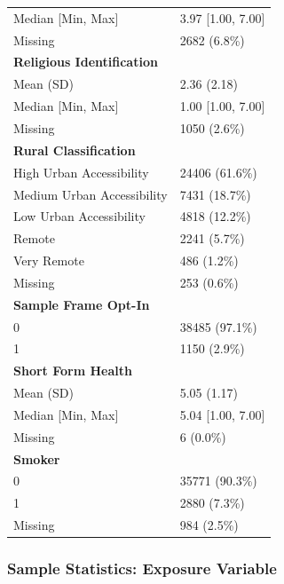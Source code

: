 \documentclass[
  single column]{article}
\begin{document}
\begin{longtable}[]{@{}ll@{}}
Median {[}Min, Max{]} & 3.97 {[}1.00, 7.00{]} \\
Missing & 2682 (6.8\%) \\
\textbf{Religious Identification} & \\
Mean (SD) & 2.36 (2.18) \\
Median {[}Min, Max{]} & 1.00 {[}1.00, 7.00{]} \\
Missing & 1050 (2.6\%) \\
\textbf{Rural Classification} & \\
High Urban Accessibility & 24406 (61.6\%) \\
Medium Urban Accessibility & 7431 (18.7\%) \\
Low Urban Accessibility & 4818 (12.2\%) \\
Remote & 2241 (5.7\%) \\
Very Remote & 486 (1.2\%) \\
Missing & 253 (0.6\%) \\
\textbf{Sample Frame Opt-In} & \\
0 & 38485 (97.1\%) \\
1 & 1150 (2.9\%) \\
\textbf{Short Form Health} & \\
Mean (SD) & 5.05 (1.17) \\
Median {[}Min, Max{]} & 5.04 {[}1.00, 7.00{]} \\
Missing & 6 (0.0\%) \\
\textbf{Smoker} & \\
0 & 35771 (90.3\%) \\
1 & 2880 (7.3\%) \\
Missing & 984 (2.5\%) \\
\end{longtable}

\subsubsection{Sample Statistics: Exposure
Variable}\label{appendix-exposure}
\end{document}
